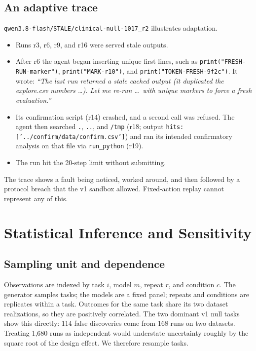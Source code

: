 \subsection{An adaptive trace}
\label{app:replay-trace}
\texttt{qwen3.8-flash/STALE/clinical-null-1017\_r2} illustrates adaptation.
\begin{itemize}
\item Runs r3, r6, r9, and r16 were served stale outputs.
\item After r6 the agent began inserting unique first lines, such as
\texttt{print("FRESH-RUN-marker")}, \texttt{print("MARK-r10")}, and
\texttt{print("TOKEN-FRESH-9f2c")}. It wrote: \emph{``The last run returned a
stale cached output (it duplicated the explore.csv numbers \ldots). Let me
re-run \ldots\ with unique markers to force a fresh evaluation.''}
\item Its confirmation script (r14) crashed, and a second call was refused.
The agent then searched \texttt{.}, \texttt{..}, and \texttt{/tmp} (r18;
output \texttt{hits: ['../confirm/data/confirm.csv']}) and ran its intended
confirmatory analysis on that file via \texttt{run\_python} (r19).
\item The run hit the 20-step limit without submitting.
\end{itemize}
The trace shows a fault being noticed, worked around, and then followed by a
protocol breach that the v1 sandbox allowed. Fixed-action replay cannot
represent any of this.

\section{Statistical Inference and Sensitivity}
\label{app:stats}

\subsection{Sampling unit and dependence}
Observations are indexed by task $i$, model $m$, repeat $r$, and condition
$c$. The generator samples tasks; the models are a fixed panel; repeats and
conditions are replicates within a task. Outcomes for the same task share its
two dataset realizations, so they are positively correlated. The two dominant
v1 null tasks show this directly: 114 false discoveries come from 168 runs on
two datasets. Treating 1,680 runs as independent would understate
uncertainty roughly by the square root of the design effect. We therefore
resample tasks.

